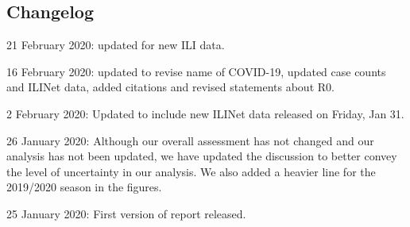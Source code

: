 \documentclass[]{article}
\begin{document}
\hypertarget{changelog}{%
\subsection{Changelog}\label{changelog}}

21 February 2020: updated for new ILI data.

16 February 2020: updated to revise name of COVID-19, updated case
counts and ILINet data, added citations and revised statements about R0.

2 February 2020: Updated to include new ILINet data released on Friday,
Jan 31.

26 January 2020: Although our overall assessment has not changed and our
analysis has not been updated, we have updated the discussion to better
convey the level of uncertainty in our analysis. We also added a heavier
line for the 2019/2020 season in the figures.

25 January 2020: First version of report released.
\end{document}
